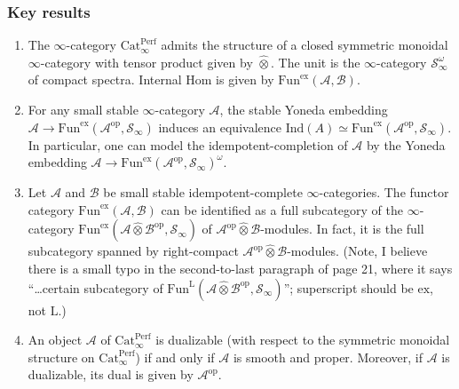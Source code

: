 \documentclass[letterpaper]{article}
\theoremstyle{definition}
\begin{document}
\subsubsection{Key results}

\begin{enumerate}
    \item The $\infty$-category $\mathrm{Cat}_\infty^\mathrm{Perf}$ admits the structure of a closed symmetric monoidal $\infty$-category with tensor product given by $\widehat{\otimes}$. The unit is the $\infty$-category $\mathcal{S}_\infty^\omega$ of compact spectra. Internal $\mathrm{Hom}$ is given by $\mathrm{Fun}^\mathrm{ex}(\mathcal{A},\mathcal{B})$.

    \item For any small stable $\infty$-category $\mathcal{A}$, the stable Yoneda embedding $\mathcal{A} \to \mathrm{Fun}^\mathrm{ex}(\mathcal{A}^\mathrm{op}, \mathcal{S}_\infty)$ induces an equivalence $\mathrm{Ind}(A) \simeq \mathrm{Fun}^\mathrm{ex}(\mathcal{A}^\mathrm{op}, \mathcal{S}_\infty)$. In particular, one can model the idempotent-completion of $\mathcal{A}$ by the Yoneda embedding $\mathcal{A} \to \mathrm{Fun}^\mathrm{ex}(\mathcal{A}^\mathrm{op}, \mathcal{S}_\infty)^\omega$.

    \item Let $\mathcal{A}$ and $\mathcal{B}$ be small stable idempotent-complete $\infty$-categories. The functor category $\mathrm{Fun}^\mathrm{ex}(\mathcal{A},\mathcal{B})$ can be identified as a full subcategory of the $\infty$-category $\mathrm{Fun}^\mathrm{ex}(\mathcal{A}\widehat{\otimes} \mathcal{B}^\mathrm{op}, \mathcal{S}_\infty)$ of $\mathcal{A}^\mathrm{op} \widehat{\otimes} \mathcal{B}$-modules. In fact, it is the full subcategory spanned by right-compact $\mathcal{A}^\mathrm{op} \widehat{\otimes} \mathcal{B}$-modules. (Note, I believe there is a small typo in the second-to-last paragraph of page 21, where it says ``\ldots certain subcategory of $\mathrm{Fun}^\mathrm{L}(\mathcal{A}\widehat{\otimes} \mathcal{B}^\mathrm{op}, \mathcal{S}_\infty)$''; superscript should be $\mathrm{ex}$, not $\mathrm{L}$.)

    \item An object $\mathcal{A}$ of $\mathrm{Cat}_\infty^\mathrm{Perf}$ is dualizable (with respect to the symmetric monoidal structure on $\mathrm{Cat}_\infty^\mathrm{Perf}$) if and only if $\mathcal{A}$ is smooth and proper. Moreover, if $\mathcal{A}$ is dualizable, its dual is given by $\mathcal{A}^\mathrm{op}$.

\end{enumerate}
\end{document}
